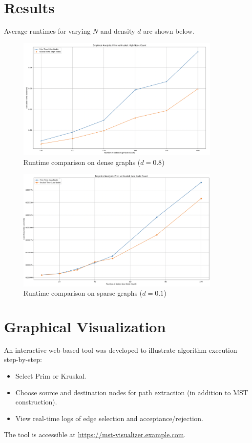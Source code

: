 \documentclass[12pt]{article}
\begin{document}
\section*{Results}
Average runtimes for varying $N$ and density $d$ are shown below.

\begin{figure}[h]
    \centering
    \includegraphics[width=0.9\textwidth]{images/more_nodes.png}
    \caption{Runtime comparison on dense graphs ($d=0.8$)}
    \label{fig:dense}
\end{figure}

\begin{figure}[h]
    \centering
    \includegraphics[width=0.9\textwidth]{images/less_nodes.png}
    \caption{Runtime comparison on sparse graphs ($d=0.1$)}
    \label{fig:sparse}
\end{figure}

\clearpage
\section*{Graphical Visualization}
An interactive web-based tool was developed to illustrate algorithm execution step-by-step:
\begin{itemize}
  \item Select Prim or Kruskal.
  \item Choose source and destination nodes for path extraction (in addition to MST construction).
  \item View real-time logs of edge selection and acceptance/rejection.
\end{itemize}
The tool is accessible at \url{https://mst-visualizer.example.com}.
\end{document}
